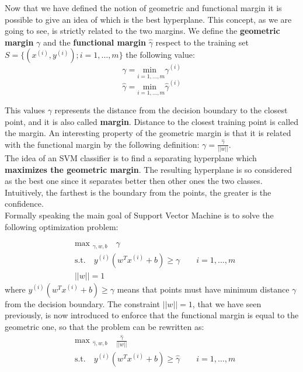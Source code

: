 Now that we have defined the notion of geometric and functional margin it is possible to give an idea of which is the best hyperplane. This concept, as we are going to see, is strictly related to the two margins. We define the \textbf{geometric margin} $\gamma$ and the \textbf{functional margin} $\hat{\gamma}$ respect to the training set $S = \{(x^{(i)},y^{(i)}); i = 1,\dots,m \}$ the following value:
$$\gamma = \underset{i = 1,\dots,m}{\text{min }}\gamma^{(i)}$$
$$\hat{\gamma} = \underset{i = 1,\dots,m}{\text{min }}\hat{\gamma}^{(i)}$$


This values $\gamma$ represents the distance from the decision boundary to the closest point, and it is also called \textbf{margin}. Distance to the closest training point is called the margin. An interesting property of the geometric margin is that it is related with the functional margin by the following definition: $\gamma = \frac{\hat{\gamma}}{||w||}$. \\
The idea of an SVM classifier is to find a separating hyperplane which \textbf{maximizes the geometric margin}. The resulting hyperplane is so considered as the best one since it separates better then other ones the two classes. Intuitively, the farthest is the boundary from the points, the greater is the confidence.\\
Formally speaking the main goal of Support Vector Machine is to solve the following optimization problem:

\begin{equation*}
\begin{aligned}
&\text{max }_{\gamma,w,b} \quad \gamma\\
&\text{s.t.} \quad y^{(i)}(w^Tx^{(i)}+b) \geq \gamma \qquad i = 1,\dots, m\\
&||w|| = 1
\end{aligned}
\end{equation*}
where $y^{(i)}(w^Tx^{(i)}+b) \geq \gamma$ means that points must have minimum distance $\gamma$ from the decision boundary.
The constraint $||w|| = 1$, that we have seen previously, is now introduced to enforce that the functional margin is equal to the geometric one, so that the problem can be rewritten as:
\begin{equation*}
\begin{aligned}
&\text{max }_{\hat{\gamma},w,b} \quad \frac{\hat{\gamma}}{||w||}\\
&\text{s.t.} \quad y^{(i)}(w^Tx^{(i)}+b) \geq \hat{\gamma} \qquad i = 1,\dots, m\\
\end{aligned}
\end{equation*}

